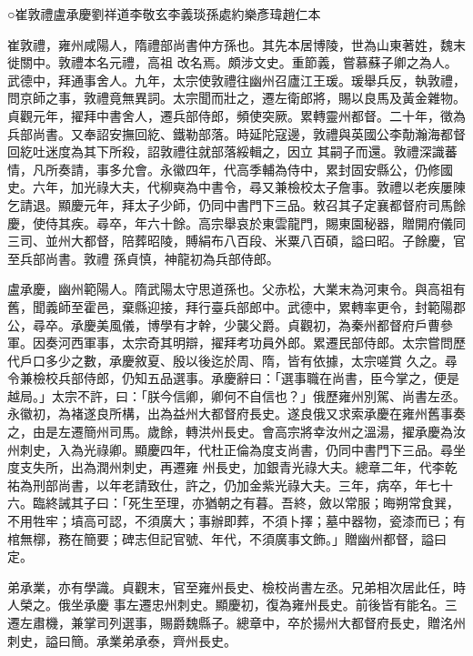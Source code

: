 
\begin{pinyinscope}

 ○崔敦禮盧承慶劉祥道李敬玄李義琰孫處約樂彥瑋趙仁本



 崔敦禮，雍州咸陽人，隋禮部尚書仲方孫也。其先本居博陵，世為山東著姓，魏末徙關中。敦禮本名元禮，高祖
 改名焉。頗涉文史。重節義，嘗慕蘇子卿之為人。武德中，拜通事舍人。九年，太宗使敦禮往幽州召廬江王瑗。瑗舉兵反，執敦禮，問京師之事，敦禮竟無異詞。太宗聞而壯之，遷左衛郎將，賜以良馬及黃金雜物。貞觀元年，擢拜中書舍人，遷兵部侍郎，頻使突厥。累轉靈州都督。二十年，徵為兵部尚書。又奉詔安撫回紇、鐵勒部落。時延陀寇邊，敦禮與英國公李勣瀚海都督回紇吐迷度為其下所殺，詔敦禮往就部落綏輯之，因立
 其嗣子而還。敦禮深識蕃情，凡所奏請，事多允會。永徽四年，代高季輔為侍中，累封固安縣公，仍修國史。六年，加光祿大夫，代柳奭為中書令，尋又兼檢校太子詹事。敦禮以老疾屢陳乞請退。顯慶元年，拜太子少師，仍同中書門下三品。敕召其子定襄都督府司馬餘慶，使侍其疾。尋卒，年六十餘。高宗舉哀於東雲龍門，賜東園秘器，贈開府儀同三司、並州大都督，陪葬昭陵，賻絹布八百段、米粟八百碩，謚曰昭。子餘慶，官至兵部尚書。敦禮
 孫貞慎，神龍初為兵部侍郎。



 盧承慶，幽州範陽人。隋武陽太守思道孫也。父赤松，大業末為河東令。與高祖有舊，聞義師至霍邑，棄縣迎接，拜行臺兵部郎中。武德中，累轉率更令，封範陽郡公，尋卒。承慶美風儀，博學有才幹，少襲父爵。貞觀初，為秦州都督府戶曹參軍。因奏河西軍事，太宗奇其明辯，擢拜考功員外郎。累遷民部侍郎。太宗嘗問歷代戶口多少之數，承慶敘夏、殷以後迄於周、隋，皆有依據，太宗嗟賞
 久之。尋令兼檢校兵部侍郎，仍知五品選事。承慶辭曰：「選事職在尚書，臣今掌之，便是越局。」太宗不許，曰：「朕今信卿，卿何不自信也？」俄歷雍州別駕、尚書左丞。永徽初，為褚遂良所構，出為益州大都督府長史。遂良俄又求索承慶在雍州舊事奏之，由是左遷簡州司馬。歲餘，轉洪州長史。會高宗將幸汝州之溫湯，擢承慶為汝州刺史，入為光祿卿。顯慶四年，代杜正倫為度支尚書，仍同中書門下三品。尋坐度支失所，出為潤州刺史，再遷雍
 州長史，加銀青光祿大夫。總章二年，代李乾祐為刑部尚書，以年老請致仕，許之，仍加金紫光祿大夫。三年，病卒，年七十六。臨終誡其子曰：「死生至理，亦猶朝之有暮。吾終，斂以常服；晦朔常食巽，不用牲牢；墳高可認，不須廣大；事辦即葬，不須卜擇；墓中器物，瓷漆而已；有棺無槨，務在簡要；碑志但記官號、年代，不須廣事文飾。」贈幽州都督，謚曰定。



 弟承業，亦有學識。貞觀末，官至雍州長史、檢校尚書左丞。兄弟相次居此任，時人榮之。俄坐承慶
 事左遷忠州刺史。顯慶初，復為雍州長史。前後皆有能名。三遷左肅機，兼掌司列選事，賜爵魏縣子。總章中，卒於揚州大都督府長史，贈洺州刺史，謚曰簡。承業弟承泰，齊州長史。




\end{pinyinscope}
